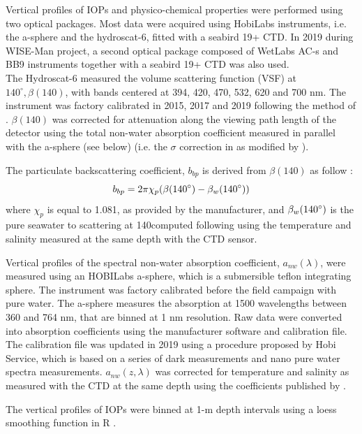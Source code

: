 \documentclass[essd, manuscript]{copernicus}
\begin{document}
Vertical profiles of IOPs and physico-chemical properties were performed using two optical packages. Most data were acquired using HobiLabs instruments, i.e. the a-sphere and the hydroscat-6, fitted with a seabird 19+ CTD. In 2019 during WISE-Man project, a second optical package composed of WetLabs AC-s and BB9 instruments together with a seabird 19+ CTD was also used.\\

The Hydroscat-6 measured the volume scattering function (VSF) at $140^{\circ}, \beta(140)$, with bands centered at 394, 420, 470, 532, 620 and 700 nm. The instrument was factory calibrated in 2015, 2017 and 2019 following the method of \citet{Maffione1997}. $\beta(140)$ was corrected for attenuation along the viewing path length of the detector using the total non-water absorption coefficient measured in parallel with the a-sphere (see below) (i.e. the $\sigma$ correction in \citet{Maffione1997} as modified by \citet{Doxaran2016}). 

The particulate backscattering coefficient, $b_{bp}$ is derived from $\beta(140)$ as follow \citep{Maffione1997}:
\begin{equation}
b_{bp} = 2\pi\chi_p(\beta(140^{\circ}) - \beta_w(140^{\circ}))
\end{equation}
where $\chi_p$ is equal to 1.081, as provided by the manufacturer,  and $\beta_w(140^{\circ})$ is the pure seawater to scattering at 140\degree computed following \citet{Zhang2009a} using the temperature and salinity measured at the same depth with the CTD sensor. 



Vertical profiles of the spectral non-water absorption coefficient, $a_{nw}(\lambda)$, were measured using an HOBILabs a-sphere, which is a submersible teflon integrating sphere. The instrument was factory calibrated before the field campaign with pure water. The a-sphere measures the absorption at 1500 wavelengths between 360 and 764 nm, that are binned at 1 nm resolution. Raw data were converted into absorption coefficients using the manufacturer software and calibration file. The calibration file was updated in 2019 using a procedure proposed by Hobi Service, which is based on a series of dark measurements and nano pure water spectra measurements. $a_{nw}(z, \lambda)$ was corrected for temperature and salinity as measured with the CTD at the same depth using the coefficients published by \citet{Rottgers2014}. 


The vertical profiles of IOPs were binned at 1-m depth intervals using a loess smoothing function in R \citep{Cleveland1992}.  
 
\end{document}
